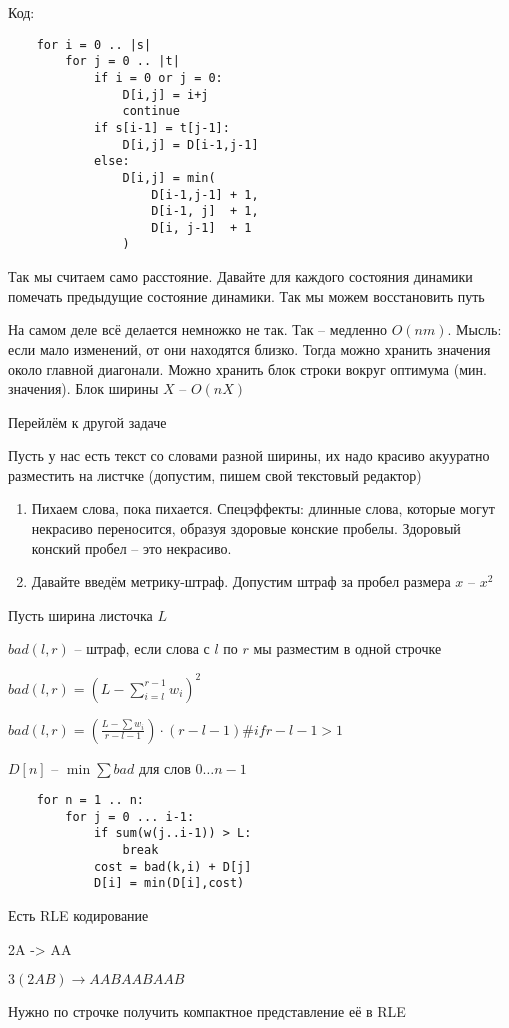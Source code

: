 \documentclass{book}
\theoremstyle{definition}
\begin{document}
Код:
\begin{verbatim}
    for i = 0 .. |s|
        for j = 0 .. |t|
            if i = 0 or j = 0:
                D[i,j] = i+j
                continue
            if s[i-1] = t[j-1]:
                D[i,j] = D[i-1,j-1]
            else:
                D[i,j] = min(
                    D[i-1,j-1] + 1,
                    D[i-1, j]  + 1,
                    D[i, j-1]  + 1
                )
\end{verbatim}

Так мы считаем само расстояние. Давайте для каждого состояния динамики помечать предыдущие состояние динамики. Так мы можем восстановить путь

На самом деле всё делается немножко не так. Так -- медленно $O(nm)$. Мысль: если мало изменений, от они находятся близко. Тогда можно хранить значения около главной диагонали. Можно хранить блок строки вокруг оптимума (мин. значения). Блок ширины $X$ --  $O(nX)$

Перейлём к другой задаче

Пусть у нас есть текст со словами разной ширины, их надо красиво акууратно разместить на листчке (допустим, пишем свой текстовый редактор)
 \begin{enumerate}
    \item Пихаем слова, пока пихается. Спецэффекты: длинные слова, которые могут некрасиво переносится, образуя здоровые конские пробелы. Здоровый конский пробел -- это некрасиво. 
    \item Давайте введём метрику-штраф. Допустим штраф за пробел размера $x$ --  $x^2$
\end{enumerate}

Пусть ширина листочка $L$

$bad(l,r)$ -- штраф, если слова с  $l$ по  $r$ мы разместим в одной строчке

$bad(l,r) = \left( L - \sum_{i=l}^{r-1} w_i \right)^2 $ 

$bad(l,r) = \left( \frac{L-\sum w_i}{r-l-1} \right) \cdot (r-l-1) \#  if r-l-1>1$

$D[n]$ --  $\min \sum bad$ для слов  $0\ldots n-1$

\begin{verbatim}
    for n = 1 .. n:
        for j = 0 ... i-1:
            if sum(w(j..i-1)) > L:
                break
            cost = bad(k,i) + D[j]
            D[i] = min(D[i],cost)
\end{verbatim}

\begin{problem}
    Есть RLE кодирование

    2A -> AA

    $3(2AB) \to A A B A A B A A B$

    Нужно по строчке получить компактное представление её в RLE
\end{problem}
\end{document}
